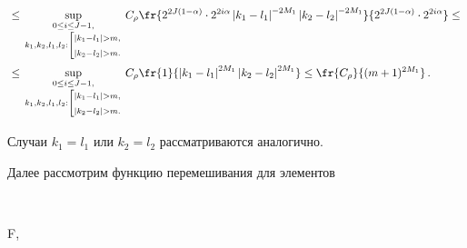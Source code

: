 \begin{align}
&{}\leq \sup\limits_{{\begin{smallmatrix}0\leq i\leq J-1,\\


k_1,k_2,l_1,l_2:\left[ \begin{gathered}


{\scriptstyle |k_1-l_1|>m,}\\ {\scriptstyle  |k_2-l_2|>m.}\end{gathered}


\right.\end{smallmatrix}}}


C_\rho \fr{2^{2J(1-\alpha)}\cdot 2^{2i\alpha}\left\vert k_1-l_1\right\vert^{-2M_1}


\left\vert k_2-l_2\right\vert^{-2M_1}}


{2^{2J(1-\alpha)}\cdot 2^{2i\alpha}}\leq{}\notag\\


&{}\leq \sup\limits_{{\begin{smallmatrix}0\leq


i\leq J-1,\\k_1,k_2,l_1,l_2:\left[


\begin{gathered}


{\scriptstyle |k_1-l_1|>m,}\\ {\scriptstyle  |k_2-l_2|>m.}\end{gathered}


\right.\end{smallmatrix}}}


C_\rho\fr{1}{\left\vert k_1-l_1\right\vert^{2M_1}\left\vert k_2-l_2\right\vert^{2M_1}}


\leq \fr{C_\rho}{(m+1)^{2M_1}} \,.


\label{rho_1}


\end{align}


%


Случаи $k_1 = l_1$ или $k_2 = l_2$ рассматриваются аналогично.





\pagebreak





Далее рассмотрим функцию перемешивания для элементов


$$


F,\enskip


